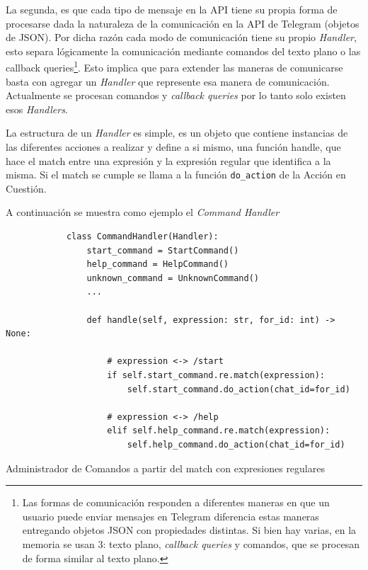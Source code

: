         \par La segunda, es que cada tipo de mensaje en la API tiene su propia forma de procesarse dada la naturaleza de la comunicación en la API de \gls{Telegram} (objetos de JSON). Por dicha razón cada modo de comunicación tiene su propio \textit{Handler}, esto separa lógicamente la comunicación mediante comandos del texto plano o las callback queries\footnote{Las formas de comunicación responden a diferentes maneras en que un usuario puede enviar mensajes en \gls{Telegram} diferencia estas maneras entregando objetos JSON con propiedades distintas. Si bien hay varias, en la memoria se usan 3: texto plano, \textit{callback queries} y comandos, que se procesan de forma similar al texto plano.}. Esto implica que para extender las maneras de comunicarse basta con agregar un \textit{Handler} que represente esa manera de comunicación. Actualmente se procesan comandos y \textit{callback queries} por lo tanto solo existen esos \textit{Handlers}.

        \par La estructura de un \textit{Handler} es simple, es un objeto que contiene instancias de las diferentes acciones a realizar y define a si mismo, una función handle, que hace el match entre una expresión y la expresión regular que identifica a la misma. Si el match se cumple se llama a la función \texttt{do_action} de la Acción en Cuestión.

        \par A continuación se muestra como ejemplo el \textit{Command Handler}
        
        \begin{listing}
        \begin{verbatim}
            class CommandHandler(Handler):
                start_command = StartCommand()
                help_command = HelpCommand()
                unknown_command = UnknownCommand()
                ...

                def handle(self, expression: str, for_id: int) -> None:

                    # expression <-> /start
                    if self.start_command.re.match(expression):
                        self.start_command.do_action(chat_id=for_id)

                    # expression <-> /help
                    elif self.help_command.re.match(expression):
                        self.help_command.do_action(chat_id=for_id)
        \end{verbatim}
        \caption[Command \textit{Handler}]{Administrador de Comandos a partir del match con expresiones regulares}
        \end{listing}

